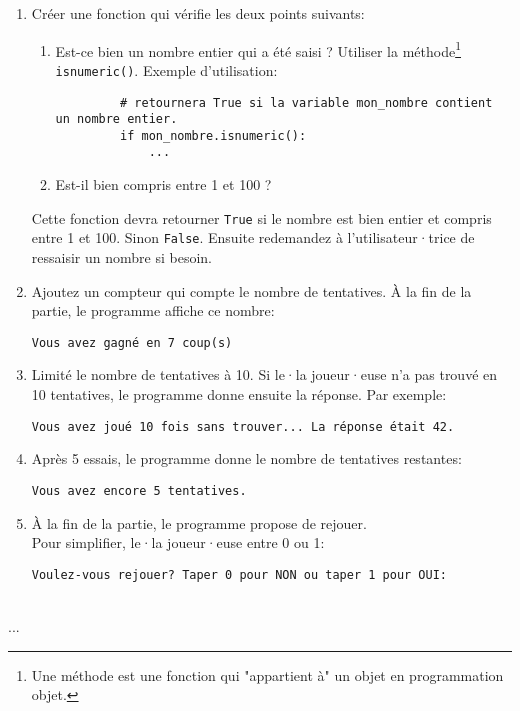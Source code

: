 \documentclass[a4paper,12pt]{article}
\begin{document}
\begin{enumerate}[topsep=0pt,itemsep=0pt,parsep=30pt,partopsep=0pt]
\item Créer une fonction qui vérifie les deux points suivants:
    \begin{enumerate}
    \item Est-ce bien un nombre entier qui a été saisi ?
          Utiliser la méthode\footnote{Une méthode est une fonction qui "appartient à" un objet en programmation objet.} \lstinline{isnumeric()}. Exemple d'utilisation:
        \begin{lstlisting}
         # retournera True si la variable mon_nombre contient un nombre entier.
         if mon_nombre.isnumeric():
             ...
        \end{lstlisting}
    \item Est-il bien compris entre 1 et 100 ?
    \end{enumerate}
    Cette fonction devra retourner \lstinline{True} si le nombre est bien entier et compris entre 1 et 100. Sinon \lstinline{False}. Ensuite redemandez à l'utilisateur·trice de ressaisir un nombre si besoin.
\item Ajoutez un compteur qui compte le nombre de tentatives. À la fin de la partie, le programme affiche ce nombre:
\begin{lstlisting}
Vous avez gagné en 7 coup(s)
\end{lstlisting}
\item Limité le nombre de tentatives à 10. Si le·la joueur·euse n'a pas trouvé en 10 tentatives, le programme donne ensuite la réponse. Par exemple:
\begin{lstlisting}
Vous avez joué 10 fois sans trouver... La réponse était 42.
\end{lstlisting}
\item Après 5 essais, le programme donne le nombre de tentatives restantes:
\begin{lstlisting}
Vous avez encore 5 tentatives.
\end{lstlisting}
\item À la fin de la partie, le programme propose de rejouer. \\
Pour simplifier, le·la joueur·euse entre 0 ou 1:
\begin{lstlisting}
Voulez-vous rejouer? Taper 0 pour NON ou taper 1 pour OUI: 
\end{lstlisting}
\end{enumerate}

\begin{correction}
		~\\ \vspace{-5pt}
	...
\end{correction}
\finexo
\end{document}
